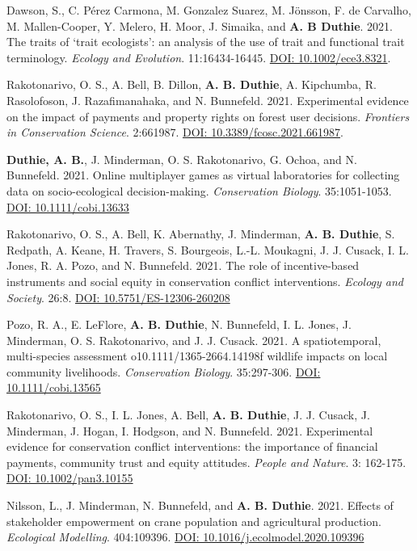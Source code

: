 \documentclass[letterpaper]{article}
\begin{document}
\begin{etaremune}
\item Dawson, S., C. P\'{e}rez Carmona, M. Gonzalez Suarez, M. J\"{o}nsson, F. de Carvalho, M. Mallen-Cooper, Y. Melero, H. Moor, J. Simaika, and {\bf A. B Duthie}. 2021. The traits of `trait ecologists': an analysis of the use of trait and functional trait terminology. {\it Ecology and Evolution}. 11:16434-16445. \href{https://onlinelibrary.wiley.com/doi/10.1002/ece3.8321}{DOI: 10.1002/ece3.8321}.
\item Rakotonarivo, O. S., A. Bell, B. Dillon, {\bf A. B. Duthie}, A. Kipchumba, R. Rasolofoson, J. Razafimanahaka, and N. Bunnefeld. 2021. Experimental evidence on the impact of payments and property rights on forest user decisions. {\it Frontiers in Conservation Science}. 2:661987. \href{https://doi.org/10.3389/fcosc.2021.661987}{DOI: 10.3389/fcosc.2021.661987}.
\item {\bf Duthie, A. B.}, J. Minderman, O. S. Rakotonarivo, G. Ochoa, and N. Bunnefeld. 2021. Online multiplayer games as virtual laboratories for collecting data on socio-ecological decision-making. {\it Conservation Biology}. 35:1051-1053. \href{https://doi.org/10.1111/cobi.13633}{DOI: 10.1111/cobi.13633}
\item Rakotonarivo, O. S., A. Bell, K. Abernathy, J. Minderman, {\bf A. B. Duthie}, S. Redpath, A. Keane, H. Travers, S. Bourgeois, L.-L. Moukagni, J. J. Cusack, I. L. Jones, R. A. Pozo, and N. Bunnefeld. 2021. The role of incentive-based instruments and social equity in conservation conflict interventions. {\it Ecology and Society}. 26:8. \href{https://www.ecologyandsociety.org/vol26/iss2/art8/}{DOI: 10.5751/ES-12306-260208}
\item Pozo, R. A., E. LeFlore, {\bf A. B. Duthie}, N. Bunnefeld, I. L. Jones, J. Minderman, O. S. Rakotonarivo, and J. J. Cusack. 2021. A spatiotemporal, multi-species assessment o10.1111/1365-2664.14198f wildlife impacts on local community livelihoods. {\it Conservation Biology}. 35:297-306. \href{https://doi.org/10.1111/cobi.13565} {DOI: 10.1111/cobi.13565}
\item Rakotonarivo, O. S., I. L. Jones, A. Bell, {\bf A. B. Duthie}, J. J. Cusack, J. Minderman, J. Hogan, I. Hodgson, and N. Bunnefeld. 2021. Experimental evidence for conservation conflict interventions: the importance of financial payments, community trust and equity attitudes. {\it People and Nature}. 3: 162-175. \href{https://doi.org/10.1002/pan3.10155}{DOI: 10.1002/pan3.10155}
\item Nilsson, L., J. Minderman, N. Bunnefeld, and {\bf A. B. Duthie}. 2021. Effects of stakeholder empowerment on crane population and agricultural production. {\it Ecological Modelling}. 404:109396. \href{https://doi.org/10.1016/j.ecolmodel.2020.109396}{DOI: 10.1016/j.ecolmodel.2020.109396}

\end{etaremune}
\end{document}
